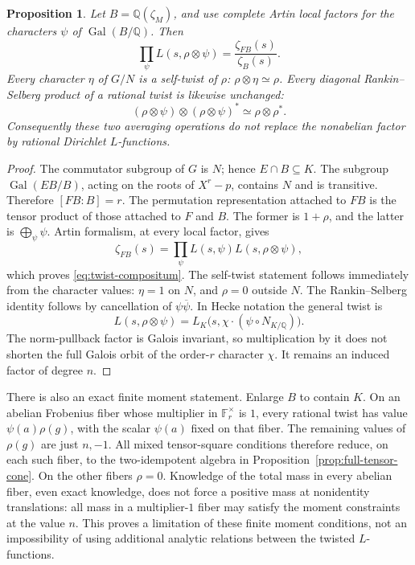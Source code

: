 \documentclass[11pt]{article}
\newtheorem{proposition}[theorem]{Proposition}
\theoremstyle{definition}
\theoremstyle{remark}
\begin{document}
\begin{proposition}\label{prop:twist-compositum-identity}
Let \(B=\mathbb Q(\zeta_M)\), and use complete Artin local factors
for the characters \(\psi\) of \(\operatorname{Gal}(B/\mathbb Q)\).
Then
\begin{equation}\label{eq:twist-compositum}
 \prod_{\psi}L(s,\rho\otimes\psi)
 =\frac{\zeta_{FB}(s)}{\zeta_B(s)}.
\end{equation}
Every character \(\eta\) of \(G/N\) is a self-twist of \(\rho\):
\(\rho\otimes\eta\simeq\rho\). Every diagonal Rankin--Selberg
product of a rational twist is likewise unchanged:
\[
 (\rho\otimes\psi)\otimes(\rho\otimes\psi)^*
 \simeq\rho\otimes\rho^*.
\]
Consequently these two averaging operations do not replace the
nonabelian factor by rational Dirichlet \(L\)-functions.
\end{proposition}

\begin{proof}
The commutator subgroup of \(G\) is \(N\); hence \(E\cap B\subseteq K\).
The subgroup \(\operatorname{Gal}(EB/B)\), acting on the roots
of \(X^r-p\), contains \(N\) and is transitive. Therefore
\([FB:B]=r\). The permutation representation attached to \(FB\)
is the tensor product of those attached to \(F\) and \(B\).
The former is \(1+\rho\), and the latter is
\(\bigoplus_\psi\psi\). Artin formalism, at every local factor, gives
\[
 \zeta_{FB}(s)
 =\prod_\psi L(s,\psi)L(s,\rho\otimes\psi),
\]
which proves \eqref{eq:twist-compositum}.
The self-twist statement follows immediately from the character
values: \(\eta=1\) on \(N\), and \(\rho=0\) outside \(N\).
The Rankin--Selberg identity follows by cancellation of
\(\psi\overline\psi\). In Hecke notation the general twist is
\[
 L(s,\rho\otimes\psi)
 =L_K\bigl(s,\chi\cdot(\psi\circ N_{K/\mathbb Q})\bigr).
\]
The norm-pullback factor is Galois invariant, so multiplication by it
does not shorten the full Galois orbit of the order-\(r\) character
\(\chi\). It remains an induced factor of degree \(n\).
\end{proof}

There is also an exact finite moment statement. Enlarge \(B\) to
contain \(K\). On an abelian Frobenius fiber whose multiplier in
\(\mathbb F_r^\times\) is \(1\), every rational twist has value
\(\psi(a)\rho(g)\), with the scalar \(\psi(a)\) fixed on that fiber.
The remaining values of \(\rho(g)\) are just \(n,-1\).
All mixed tensor-square conditions therefore reduce, on each such
fiber, to the two-idempotent algebra in
Proposition~\ref{prop:full-tensor-cone}.
On the other fibers \(\rho=0\).
Knowledge of the total mass in every abelian fiber, even exact
knowledge, does not force a positive mass at nonidentity translations:
all mass in a multiplier-\(1\) fiber may satisfy the moment constraints
at the value \(n\). This proves a limitation of these finite moment
conditions, not an impossibility of using additional analytic
relations between the twisted \(L\)-functions.
\end{document}
